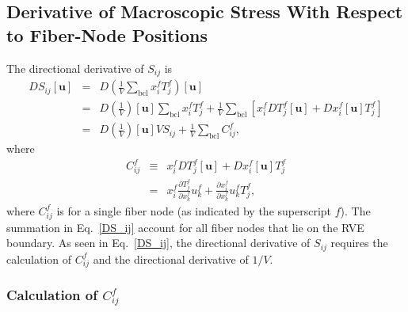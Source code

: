 \subsection{Derivative of Macroscopic Stress With Respect to Fiber-Node Positions}

The directional derivative of $S_{ij}$ is
%
\begin{eqnarray}
DS_{ij}[\textbf{u}] &=& D\left( \frac{1}{V} \sum_{\text{bcl}} x_i^f T_j^f \right)[\textbf{u}] \nonumber\\
%
&=& D \left(\frac{1}{V}\right) [\textbf{u}]\sum_{\text{bcl}} x_i^f T_j^f + \frac{1}{V} \sum_{\text{bcl}} \left[ x_i^f D T_j^f[\textbf{u}] + D x_i^f  [\textbf{u}]  T_j^f \right]\nonumber\\
%
&=& D \left(\frac{1}{V}\right) [\textbf{u}] V S_{ij} + \frac{1}{V} \sum_{\text{bcl}}  C_{ij}^f,
\label{DS_ij}
\end{eqnarray}
%
where 
%
\begin{eqnarray}
C_{ij}^f &\equiv&   x_i^f D T_j^f[\textbf{u}] + D x_i^f  [\textbf{u}]  T_j^f \nonumber\\
&=& x_i^f \frac{\partial T_j^f}{\partial x_k^f} u_k^f + \frac{\partial x_i^f}{\partial x_k^f}u_k^f T_j^f ,
\label{C_ij}
\end{eqnarray}
%
where $C_{ij}^f$ is for a single fiber node (as indicated by the superscript $f$). The summation in Eq.\ \eqref{DS_ij} account for all fiber nodes that lie on the RVE boundary. As seen in Eq.\ \eqref{DS_ij}, the directional derivative of $S_{ij}$ requires the calculation of $C_{ij}^f$ and the directional derivative of $1/V$. 

\subsubsection{Calculation of $C_{ij}^f$}

